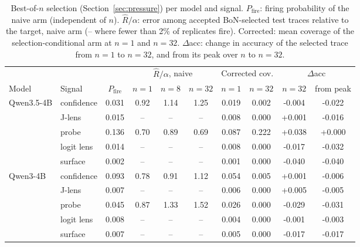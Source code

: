 \begin{table}[H]
\centering\scriptsize
\caption{Best-of-$n$ selection (Section~\ref{sec:pressure}) per model and signal. $P_{\mathrm{fire}}$: firing probability of the naive arm (independent of $n$). $\hat R/\alpha$: error among accepted BoN-selected test traces relative to the target, naive arm (-- where fewer than 2\% of replicates fire). Corrected: mean coverage of the selection-conditional arm at $n=1$ and $n=32$. $\Delta$acc: change in accuracy of the selected trace from $n=1$ to $n=32$, and from its peak over $n$ to $n=32$.}
\label{tab:bon}
\setlength{\tabcolsep}{4pt}
\begin{tabular}{ll c ccc cc cc}
\toprule
 & & & \multicolumn{3}{c}{$\hat R/\alpha$, naive} & \multicolumn{2}{c}{Corrected cov.} & \multicolumn{2}{c}{$\Delta$acc} \\
\cmidrule(lr){4-6}\cmidrule(lr){7-8}\cmidrule(lr){9-10}
Model & Signal & $P_{\mathrm{fire}}$ & $n{=}1$ & $n{=}8$ & $n{=}32$ & $n{=}1$ & $n{=}32$ & $n{=}32$ & from peak \\
\midrule
Qwen3.5-4B & confidence & 0.031 & 0.92 & 1.14 & 1.25 & 0.019 & 0.002 & -0.004 & -0.022 \\
 & J-lens & 0.015 & -- & -- & -- & 0.008 & 0.000 & +0.001 & -0.016 \\
 & probe & 0.136 & 0.70 & 0.89 & 0.69 & 0.087 & 0.222 & +0.038 & +0.000 \\
 & logit lens & 0.014 & -- & -- & -- & 0.008 & 0.000 & -0.017 & -0.032 \\
 & surface & 0.002 & -- & -- & -- & 0.001 & 0.000 & -0.040 & -0.040 \\
\addlinespace
Qwen3-4B & confidence & 0.093 & 0.78 & 0.91 & 1.12 & 0.054 & 0.005 & +0.001 & -0.006 \\
 & J-lens & 0.007 & -- & -- & -- & 0.006 & 0.000 & +0.005 & -0.005 \\
 & probe & 0.045 & 0.87 & 1.33 & 1.52 & 0.026 & 0.000 & -0.029 & -0.031 \\
 & logit lens & 0.008 & -- & -- & -- & 0.004 & 0.000 & -0.001 & -0.003 \\
 & surface & 0.007 & -- & -- & -- & 0.005 & 0.000 & -0.017 & -0.017 \\
\bottomrule
\end{tabular}
\end{table}
